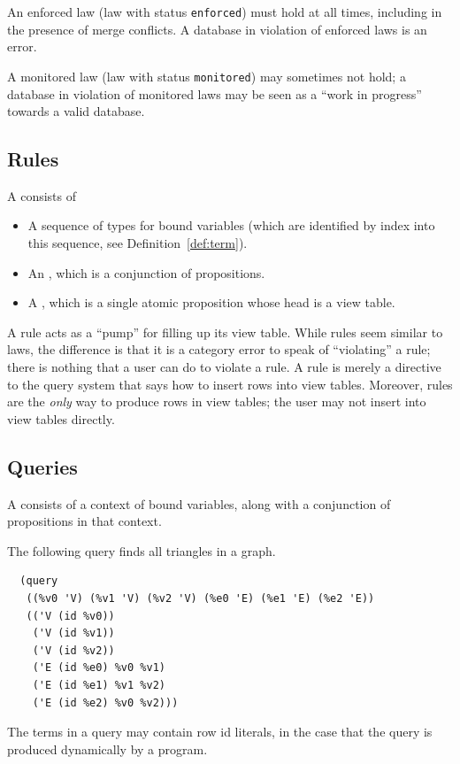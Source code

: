 \documentclass{scrartcl}
\begin{document}
An enforced law (law with status \verb|enforced|) must hold at all times, including in the presence of merge conflicts. A database in violation of enforced laws is an error.

A monitored law (law with status \verb|monitored|) may sometimes not hold; a database in violation of monitored laws may be seen as a ``work in progress'' towards a valid database.

\subsection{Rules} \label{sec:rules}

\begin{definition}
  A  consists of
  \begin{itemize}
    \item A sequence of types for bound variables (which are identified by index into this sequence, see Definition~\ref{def:term}).
    \item An , which is a conjunction of propositions.
    \item A , which is a single atomic proposition whose head is a view table.
  \end{itemize}
\end{definition}

A rule acts as a ``pump'' for filling up its view table. While rules seem similar to laws, the difference is that it is a category error to speak of ``violating'' a rule; there is nothing that a user can do to violate a rule. A rule is merely a directive to the query system that says how to insert rows into view tables. Moreover, rules are the \emph{only} way to produce rows in view tables; the user may not insert into view tables directly.

\subsection{Queries} \label{sec:query}

\begin{definition}
  A  consists of a context of bound variables, along with a conjunction of propositions in that context.
\end{definition}

\begin{example}
  The following query finds all triangles in a graph.
  \begin{verbatim}
  (query
   ((%v0 'V) (%v1 'V) (%v2 'V) (%e0 'E) (%e1 'E) (%e2 'E))
   (('V (id %v0))
    ('V (id %v1))
    ('V (id %v2))
    ('E (id %e0) %v0 %v1)
    ('E (id %e1) %v1 %v2)
    ('E (id %e2) %v0 %v2)))
  \end{verbatim}
\end{example}
%
\noindent The terms in a query may contain row id literals, in the case that the query is produced dynamically by a program.
\end{document}
